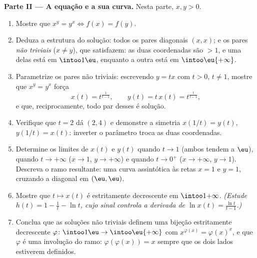 \begin{problem}
\medskip
\noindent\textbf{Parte II --- A equação e a sua curva.} Nesta
parte, $x, y > 0$.
\begin{enumerate}
  \item Mostre que $x^y = y^x \iff f(x) = f(y)$.
  \item Deduza a estrutura do  solução: todos os pares
        diagonais $(x, x)$; e os pares \emph{não triviais} ($x \neq
        y$), que satisfazem: as duas coordenadas são $> 1$, e uma
        delas está em $\intoo1\eu$, enquanto a outra está em
        $\intoo\eu{+\infty}$.
  \item Parametrize os pares não triviais: escrevendo $y = tx$ com $t
        > 0$, $t \neq 1$, mostre que $x^y = y^x$ força
        \[
        x(t) = t^{\frac1{t-1}},
        \qquad
        y(t) = t\,x(t) = t^{\frac{t}{t-1}},
        \]
        e que, reciprocamente, todo par desses é solução.
  \item Verifique que $t = 2$ dá $(2, 4)$ e demonstre a simetria
        $x(1/t) = y(t)$, $y(1/t) = x(t)$: inverter o parâmetro
        troca as duas coordenadas.
  \item Determine os limites de $x(t)$ e $y(t)$ quando $t \to 1$
        (ambos tendem a $\eu$), quando $t \to +\infty$ ($x \to 1$, $y
        \to +\infty$) e quando $t \to 0^+$ ($x \to +\infty$, $y \to
        1$). Descreva o ramo resultante: uma curva assintótica às
        retas $x = 1$ e $y = 1$, cruzando a diagonal em
        $(\eu, \eu)$.
  \item Mostre que $t \mapsto x(t)$ é estritamente decrescente em
        $\intoo1{+\infty}$. \emph{(Estude $h(t) = 1 - \frac1t - \ln
        t$, cujo sinal controla a derivada de $\ln x(t) =
        \frac{\ln t}{t - 1}$.)}
  \item Conclua que as soluções não triviais definem uma bijeção
        estritamente decrescente $\varphi \colon \intoo1\eu \to
        \intoo\eu{+\infty}$ com $x^{\varphi(x)} = \varphi(x)^x$,
        e que $\varphi$ é uma involução do ramo:
        $\varphi(\varphi(x)) = x$ sempre que os dois lados estiverem definidos.
\end{enumerate}


\end{problem}
